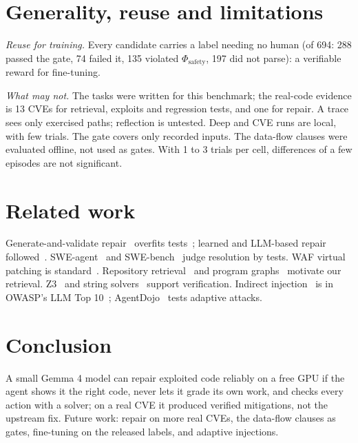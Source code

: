 \documentclass[10pt,a4paper]{article}
\newcommand{\phisafe}{\ensuremath{\Phi_{\mathrm{safety}}}}
\begin{document}
\section{Generality, reuse and limitations}
\emph{Reuse for training.} Every candidate carries a label needing no human (of 694: 288 passed the gate, 74 failed it, 135 violated \phisafe{}, 197 did not parse): a verifiable reward for fine-tuning.

\emph{What may not.} The tasks were written for this benchmark; the real-code evidence is 13 CVEs for retrieval, exploits and regression tests, and one for repair. A trace sees only exercised paths; reflection is untested. Deep and CVE runs are local, with few trials. The gate covers only recorded inputs. The data-flow clauses were evaluated offline, not used as gates. With 1 to 3 trials per cell, differences of a few episodes are not significant.

\section{Related work}
Generate-and-validate repair~\cite{r1,r2} overfits tests~\cite{r3}; learned and LLM-based repair followed~\cite{r4,r5}. SWE-agent~\cite{r6} and SWE-bench~\cite{r7} judge resolution by tests. WAF virtual patching is standard~\cite{r8}. Repository retrieval~\cite{r9} and program graphs~\cite{r10} motivate our retrieval. Z3~\cite{r11} and string solvers~\cite{r12} support verification. Indirect injection~\cite{r16} is in OWASP's LLM Top 10~\cite{r13}; AgentDojo~\cite{r17} tests adaptive attacks.

\section{Conclusion}
A small Gemma 4 model can repair exploited code reliably on a free GPU if the agent shows it the right code, never lets it grade its own work, and checks every action with a solver; on a real CVE it produced verified mitigations, not the upstream fix. Future work: repair on more real CVEs, the data-flow clauses as gates, fine-tuning on the released labels, and adaptive injections.
\end{document}
